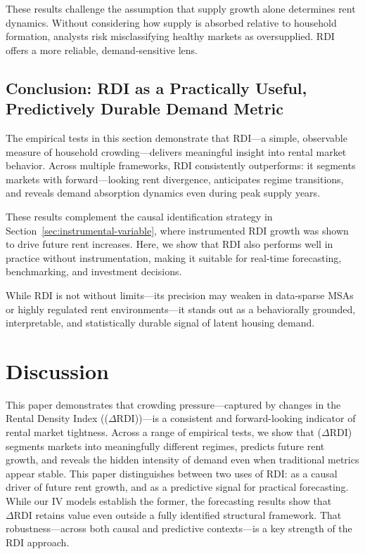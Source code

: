 \documentclass[APA,Times1COL]{WileyNJDv5} %
\begin{document}
These results challenge the assumption that supply growth alone determines rent dynamics. Without considering how supply is absorbed relative to household formation, analysts risk misclassifying healthy markets as oversupplied. RDI offers a more reliable, demand-sensitive lens.

\subsection{Conclusion: RDI as a Practically Useful, Predictively Durable Demand Metric}
The empirical tests in this section demonstrate that RDI---a simple, observable measure of household crowding---delivers meaningful insight into rental market behavior. Across multiple frameworks, RDI consistently outperforms: it segments markets with forward---looking rent divergence, anticipates regime transitions, and reveals demand absorption dynamics even during peak supply years.

These results complement the causal identification strategy in Section~\ref{sec:instrumental-variable}, where instrumented RDI growth was shown to drive future rent increases. Here, we show that RDI also performs well in practice without instrumentation, making it suitable for real-time forecasting, benchmarking, and investment decisions.

While RDI is not without limits—its precision may weaken in data-sparse MSAs or highly regulated rent environments—it stands out as a behaviorally grounded, interpretable, and statistically durable signal of latent housing demand.


\section{Discussion}

This paper demonstrates that crowding pressure—captured by changes in the Rental Density Index ((\(\Delta\text{RDI}\)))—is a consistent and forward-looking indicator of rental market tightness. Across a range of empirical tests, we show that (\(\Delta\text{RDI}\)) segments markets into meaningfully different regimes, predicts future rent growth, and reveals the hidden intensity of demand even when traditional metrics appear stable. This paper distinguishes between two uses of RDI: as a causal driver of future rent growth, and as a predictive signal for practical forecasting. While our IV models establish the former, the forecasting results show that \(\Delta \text{RDI}\) retains value even outside a fully identified structural framework. That robustness—across both causal and predictive contexts—is a key strength of the RDI approach.
\end{document}

